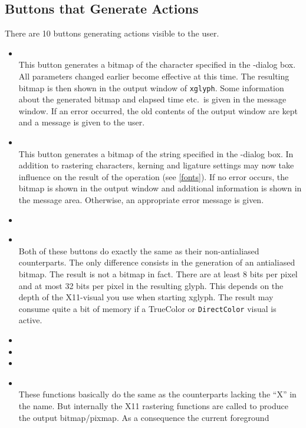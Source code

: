 \subsection{Buttons that Generate Actions}
There are 10 buttons generating actions visible to the user. 
\begin{itemize}
\item {}\\
  This button generates a bitmap of the character specified in the
  -dialog box. All parameters changed
  earlier become effective at this time. The resulting bitmap is then
  shown in the output window of \verb+xglyph+. Some information about
  the generated bitmap and elapsed 
  time etc.\ is given in the message window. If an error occurred,
  the old contents of the output window are kept and a message is given
  to the user. 
\item {}\\
  This button generates a bitmap of the string specified in the
  -dialog box. In addition to rastering
  characters, kerning and ligature settings may now take influence on
  the result of the operation (see \ref{fonts}). If no error occurs,
  the bitmap is shown in the output window and additional information is
  shown in the message area. Otherwise, an appropriate error message is
  given.
\item {}
\item {}\\
  Both of these buttons do exactly the same as their non-antialiased
  counterparts. The only difference consists in the generation of an
  antialiased bitmap. The result is not a bitmap in fact.
  There are at least 8 bits per pixel and at most 32 bits per
  pixel in the resulting glyph. This depends on the depth of the
  X11-visual you use when starting xglyph. The result may consume
  quite a bit of memory
  if a {\ttfamily TrueColor} or {\tt DirectColor} visual is
  active.
\item {}
\item {}
\item {}
\item {}\\
  These functions basically do the same as the counterparts lacking the ``X''
  in the name. But internally the X11 rastering functions are called to
  produce the output bitmap/pixmap. As a consequence the current foreground

\end{itemize}
